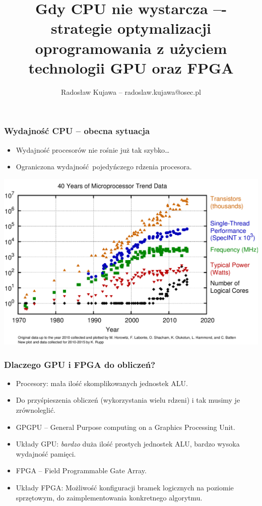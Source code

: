\documentclass[dvipsnames,table]{beamer}
\title{Gdy CPU nie wystarcza –- strategie optymalizacji oprogramowania z użyciem technologii GPU oraz FPGA}
\author{Radosław Kujawa -- radoslaw.kujawa@osec.pl}
\institute{OSEC}
\begin{document}
\begin{frame}
	\titlepage
\end{frame}

\begin{frame}
\frametitle{Wydajność CPU -- obecna sytuacja}
\begin{itemize}
	\item Wydajność procesorów nie rośnie już tak szybko\dots
	\item Ograniczona wydajność pojedyńczego rdzenia procesora.
\end{itemize}
\begin{center}
\includegraphics[scale=0.25]{img-40years.png}
\end{center}
\end{frame}

\begin{frame}
	\frametitle{Dlaczego GPU i FPGA do obliczeń?}
\begin{itemize}
	\item Procesory: mała ilość skomplikowanych jednostek ALU.
	\item Do przyśpieszenia obliczeń (wykorzystania wielu rdzeni) i tak musimy je zrównoleglić.
	\item GPGPU -- General Purpose computing on a Graphics Processing Unit. 
	\item Układy GPU: {\em bardzo} duża ilość prostych jednostek ALU, bardzo wysoka wydajność pamięci.
	\item FPGA -- Field Programmable Gate Array.
	\item Układy FPGA: Możliwość konfiguracji bramek logicznych na poziomie sprzętowym, do zaimplementowania konkretnego algorytmu.
	
\end{itemize}
\end{frame}
\end{document}
